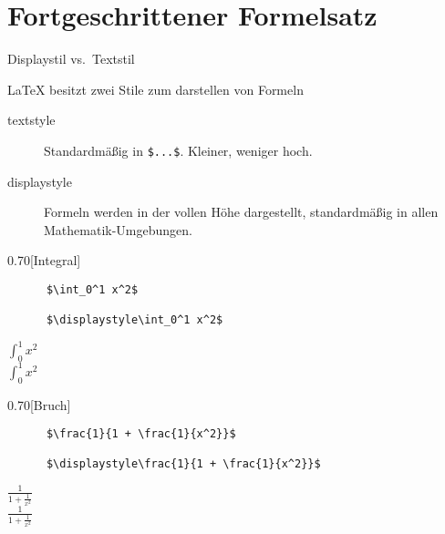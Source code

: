 \section{Fortgeschrittener Formelsatz}

\begin{frame}[fragile]{Displaystil vs.\ Textstil}
  
  \LaTeX{} besitzt zwei Stile zum darstellen von Formeln
  \begin{description}
    \item[textstyle] Standardmäßig in \lstinline+$...$+. Kleiner, weniger hoch.
    \item[displaystyle] Formeln werden in der vollen Höhe dargestellt, standardmäßig in allen Mathematik-Umgebungen.
  \end{description}

  \begin{CodeExample}{0.70}[Integral]
    \begin{lstlisting}
      $\int_0^1 x^2$

      $\displaystyle\int_0^1 x^2$
    \end{lstlisting}
  \CodeResult
    \strut
    $\int_0^1 x^2$ \\[0.5\baselineskip]
    $\displaystyle\int_0^1 x^2$
  \end{CodeExample}

  \begin{CodeExample}{0.70}[Bruch]
    \begin{lstlisting}
      $\frac{1}{1 + \frac{1}{x^2}}$

      $\displaystyle\frac{1}{1 + \frac{1}{x^2}}$
    \end{lstlisting}
  \CodeResult
    $\frac{1}{1 + \frac{1}{x^2}}$\\[0.5\baselineskip]
    $\displaystyle\frac{1}{1 + \frac{1}{x^2}}$
  \end{CodeExample}
\end{frame}

